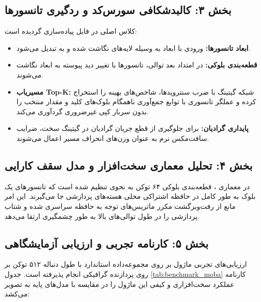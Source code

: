 \subsection*{بخش ۳: کالبدشکافی سورس‌کد و ردگیری تانسورها }
کلاس اصلی  در فایل  پیاده‌سازی گردیده است:
\begin{itemize}
    \item \textbf{ابعاد تانسورها:} ورودی با ابعاد \lr{$[B, N, D]$} به وسیله لایه‌های  نگاشت شده و به \lr{$[B, H, N, d]$} تبدیل می‌شود.
    \item \textbf{قطعه‌بندی بلوکی:} در امتداد بعد توالی، تانسورها با تغییر دید پیوسته به ابعاد  نگاشت می‌شوند.
    \item \textbf{مسیریاب Top-K:} شبکه گیتینگ با ضرب سنترویدها، شاخص‌های بهینه را استخراج کرده و عملگر تانسوری با توابع جمع‌آوری ناهمگام  بلوک‌های کلید و مقدار منتخب را بدون سربار کپی غیرضروری گردآوری می‌کند.
    \item \textbf{پایداری گرادیان:} برای جلوگیری از قطع جریان گرادیان در گیتینگ سخت، ضرایب سافت‌مکس نرم به عنوان وزن‌های انحراف مسیر اعمال می‌شوند.
\end{itemize}

\subsection*{بخش ۴: تحلیل معماری سخت‌افزار و مدل سقف کارایی }
در معماری ، قطعه‌بندی بلوکی ۶۴ توکن به نحوی تنظیم شده است که تانسورهای یک بلوک به طور کامل در حافظه اشتراکی محلی  هسته‌های پردازشی  جا می‌گیرند. این امر مانع از رفت‌و‌برگشت مکرر ماتریس‌های توجه به حافظه سراسری  شده و شتاب پردازشی را در طول توالی‌های بالا به طور چشمگیری ارتقا می‌دهد.

\subsection*{بخش ۵: کارنامه تجربی و ارزیابی آزمایشگاهی }
ارزیابی‌های تجربی ماژول  بر روی مجموعه‌داده استاندارد  با طول دنباله ۵۱۲ توکن بر روی پردازنده گرافیکی  انجام پذیرفته است. جدول \ref{tab:benchmark_moba} کارنامه عملکرد سخت‌افزاری و کیفی این ماژول را در مقایسه با مدل‌های پایه به تصویر می‌کشد:


